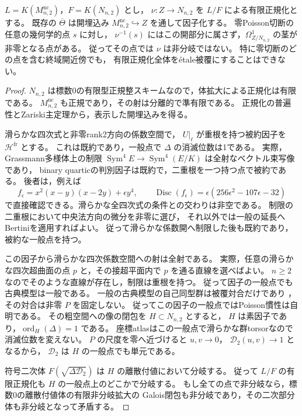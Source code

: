 \begin{proposition}[有限正規化の零切断上の欠落分岐点]
\label{prop:degree-two-normalization-zero-boundary}
$L=K(M^{\mathrm{nc}}_{n,2})$，$F=K(N_{n,2})$ とし，
$\nu:Z\to N_{n,2}$ を $L/F$ による有限正規化とする。
既存の $\overline\Theta$ は開埋込み
$M^{\mathrm{nc}}_{n,2}\hookrightarrow Z$ を通して因子化する。
零Poisson切断の任意の幾何学的点 $s$ に対し，
$\nu^{-1}(s)$ にはこの開部分に属さず，$\Omega^1_{Z/N_{n,2}}$ の茎が非零となる点がある。
従ってその点では $\nu$ は非分岐ではない。
特に零切断のどの点を含む終域開近傍でも，
有限正規化全体を\'{e}tale被覆にすることはできない。
\end{proposition}
\begin{proof}
$N_{n,2}$ は標数0の有限型正規整スキームなので，体拡大による正規化は有限である。
$M^{\mathrm{nc}}_{n,2}$ も正規であり，その射は分離的で準有限である。
正規化の普遍性とZariski主定理から，表示した開埋込みを得る。

滑らかな四次式と非零rank2方向の係数空間で，
$U|_\ell$ が重根を持つ被約因子を $\mathcal H^{\mathrm{fr}}$ とする。
これは既約であり，一般点で $\Delta$ の消滅位数は1である。
実際，Grassmann多様体上の制限
$\operatorname{Sym}^4E\to\operatorname{Sym}^4(E/K)$ は全射なベクトル束写像であり，
binary quarticの判別因子は既約で，二重根を一つ持つ点で被約である。
後者は，例えば
\[
 f_\epsilon=x^2(x-y)(x-2y)+\epsilon y^4,\qquad
 \operatorname{Disc}(f_\epsilon)
   =\epsilon(256\epsilon^2-107\epsilon-32)
\]
で直接確認できる。滑らかな全四次式の条件との交わりは非空である。
制限の二重根において中央法方向の微分を非零に選び，
それ以外では一般の延長へBertiniを適用すればよい。
従って滑らかな係数開へ制限した後も既約であり，被約な一般点を持つ。

この因子から滑らかな四次係数空間への射は全射である。
実際，任意の滑らかな四次超曲面の点 $p$ と，その接超平面内で $p$ を通る直線を選べばよい。
$n\ge2$ なのでそのような直線が存在し，制限は重根を持つ。
従って因子の一般点でも古典模型は一般である。
一般の古典模型の自己同型群は被覆対合だけであり
\cite[命題9.4]{PoissonDP}，その対合は非零 $P$ を固定しない。
従ってこの因子の一般点ではPoisson慣性は自明である。
その粗空間への像の閉包を $H\subset N_{n,2}$ とすると，
$H$ は素因子であり，$\operatorname{ord}_H(\Delta)=1$ である。
座標atlasはこの一般点で滑らかな群torsorなので消滅位数を変えない。
$P$ の尺度を零へ近づけると $u,v\to0$，
$\mathscr D_2(u,v)\to1$ となるから，
$\mathscr D_2$ は $H$ の一般点でも単元である。

符号二次体
$F(\sqrt{\Delta\mathscr D_2})$ は $H$ の離散付値において分岐する。
従って $L/F$ の有限正規化も $H$ の一般点上のどこかで分岐する。
もし全ての点で非分岐なら，標数0の離散付値体の有限非分岐拡大の
Galois閉包も非分岐であり，その二次部分体も非分岐となって矛盾する。


\end{proof}
